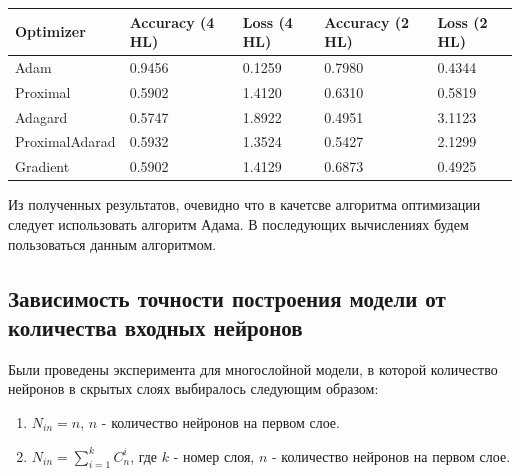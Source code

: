 \documentclass[a4paper,12pt,twoside]{article}
\begin{document}
	\begin{center}
		\begin{table}[ht!]
			\begin{tabular}{lllll}
				\hline
				\multicolumn{1}{|l|}{\textbf{Optimizer}} & \multicolumn{1}{l|}{\textbf{Accuracy (4 HL)}} & \multicolumn{1}{l|}{\textbf{Loss (4 HL)}} & \multicolumn{1}{l|}{\textbf{Accuracy (2 HL)}} & \multicolumn{1}{l|}{\textbf{Loss (2 HL)}} \\ \hline
				Adam                                     & 0.9456                                        & 0.1259                                    & 0.7980                                        & 0.4344                                    \\
				Proximal                                 & 0.5902                                        & 1.4120                                    & 0.6310                                        & 0.5819                                    \\
				Adagard                                  & 0.5747                                        & 1.8922                                    & 0.4951                                        & 3.1123                                    \\
				ProximalAdarad                           & 0.5932                                        & 1.3524                                    & 0.5427                                        & 2.1299                                    \\
				Gradient                                 & 0.5902                                        & 1.4129                                    & 0.6873                                        & 0.4925                                   
			\end{tabular}
		\end{table}
	\end{center}
	Из полученных результатов, очевидно что в качетсве алгоритма оптимизации следует использовать алгоритм Адама. В последующих вычислениях будем пользоваться данным алгоритмом.
	
	\subsection{Зависимость точности построения модели от количества входных нейронов}
	Были проведены эксперимента для многослойной модели, в которой количество нейронов  в скрытых слоях выбиралось следующим образом:
	
	\begin{enumerate}
		\item $N_{in} = n$, $n$ - количество нейронов на первом слое.	
		\item $N_{in} = \sum_{i=1}^k C_n^i$, где $k$ - номер слоя, $n$ - количество нейронов на первом слое.
	\end{enumerate}
\end{document}
